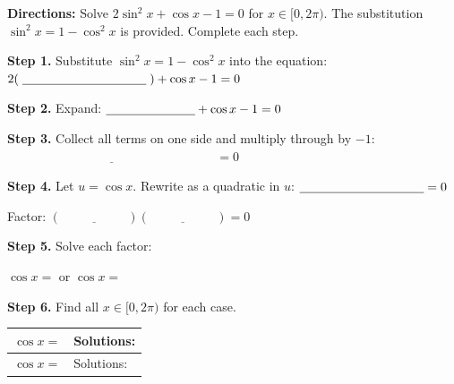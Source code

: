 \documentclass[10pt]{article}
\begin{document}
\begin{tcolorbox}[colback=white, colframe=black!40,
    title=\textbf{Tier R --- Reinforce},
    fonttitle=\bfseries, arc=2mm, left=3mm, right=3mm, top=2mm, bottom=2mm]

\textbf{Directions:} Solve $2\sin^2 x + \cos x - 1 = 0$ for $x \in [0, 2\pi)$.
The substitution $\sin^2 x = 1 - \cos^2 x$ is provided. Complete each step.

\vspace{6pt}
\textbf{Step 1.} Substitute $\sin^2 x = 1 - \cos^2 x$ into the equation:
\vspace{4pt}
$2(\;\underline{\hspace{3.5cm}}\;) + \cos x - 1 = 0$

\vspace{8pt}
\textbf{Step 2.} Expand:
$\underline{\hspace{2.5cm}} + \cos x - 1 = 0$

\vspace{8pt}
\textbf{Step 3.} Collect all terms on one side and multiply through by $-1$:
$\underline{\hspace{7cm}} = 0$

\vspace{8pt}
\textbf{Step 4.} Let $u = \cos x$. Rewrite as a quadratic in $u$:
$\underline{\hspace{3.5cm}} = 0$

\vspace{4pt}
Factor: $(\;\underline{\hspace{2cm}}\;)(\;\underline{\hspace{2cm}}\;) = 0$

\vspace{8pt}
\textbf{Step 5.} Solve each factor:
\vspace{4pt}

$\cos x = $ \underline{\hspace{2.5cm}} \qquad or \qquad $\cos x = $ \underline{\hspace{2.5cm}}

\vspace{8pt}
\textbf{Step 6.} Find all $x \in [0, 2\pi)$ for each case.

\vspace{4pt}
\renewcommand{\arraystretch}{1.8}
\begin{tabular}{|l|l|}
\hline
$\cos x = $ \underline{\hspace{1.8cm}} & Solutions: \underline{\hspace{3.5cm}} \\
\hline
$\cos x = $ \underline{\hspace{1.8cm}} & Solutions: \underline{\hspace{3.5cm}} \\
\hline
\end{tabular}


\end{tcolorbox}
\end{document}
